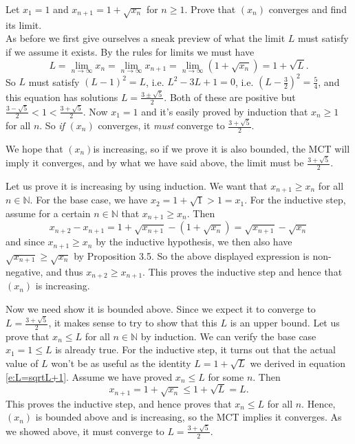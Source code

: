 \documentclass[11pt,dvipsnames]{book}
\numberwithin{figure}{section} %
\numberwithin{table}{section} %
\begin{document}
\begin{example}
\label{ex:1+sqrt(x)}
Let $x_{1}=1$ and $x_{n+1}=1+\sqrt{x_{n}}$ for $n \geq 1$. Prove that $(x_{n})$ converges and find its limit. \\

As before we first give ourselves a sneak preview of what the limit $L$ must satisfy if we assume it exists. By the rules for limits we must have
\begin{equation}
\label{e:L=sqrtL+1}
L=\lim_{n\rightarrow\infty}x_{n}
=\lim_{n\rightarrow\infty}x_{n+1}=\lim_{n\rightarrow\infty}(1+\sqrt{x_{n}})=1+\sqrt{L}.
\end{equation}
So $L$ must satisfy $(L-1)^2 = L$, i.e. $L^2 -3L +1=0$, i.e. $(L-\frac{3}{2})^2 = \frac{5}{4}$, and this equation has solutions $L = \frac{3 \pm \sqrt{5}}{2}$. Both of these are positive but $ \frac{3 -\sqrt{5}}{2} < 1 < \frac{3 + \sqrt{5}}{2}$. Now $x_1 = 1$ and it's easily proved by induction that $x_n \geq 1$ for all $n$. So {\em if} $(x_n)$ converges, it {\em must} converge to $\frac{3 + \sqrt{5}}{2}$.

We hope that $(x_n)$is increasing, so if we prove it is also bounded, the MCT will imply it converges, and by what we have said above, the limit must be $\frac{3 + \sqrt{5}}{2}$.

Let us prove it is increasing by using induction. We want that $x_{n+1}\geq x_{n}$ for all $n\in\mathbb{N}$. For the base case, we have $x_{2} = 1+\sqrt{1} > 1 = x_1$. For the inductive step, assume for a certain $n\in\mathbb{N}$ that $x_{n+1}\geq x_{n}$. Then
\[
x_{n+2}-x_{n+1}
=1+\sqrt{x_{n+1}}-(1+\sqrt{x_{n}})
=\sqrt{x_{n+1}}-\sqrt{x_{n}}
\]
and since $x_{n+1}\geq x_{n}$ by the inductive hypothesis, we then also have $\sqrt{x_{n+1}}\geq \sqrt{x_{n}}$ by Proposition 3.5. So the above displayed expression is non-negative, and thus $x_{n+2}\geq x_{n+1}$. This proves the inductive step and hence that $(x_n)$ is increasing.

Now we need show it is bounded above. Since we expect it to converge to $L = \frac{3 + \sqrt{5}}{2}$, it makes sense to try to show that this $L$ is an upper bound.
Let us prove that $x_{n}\leq L$ for all $n\in\mathbb{N}$ by induction.
We can verify the base case $x_{1}=1\leq L$ is already true. For the inductive step, it turns out that the actual value of $L$ won't be as useful as the identity $L=1+\sqrt{L}$ we derived in equation \eqref{e:L=sqrtL+1}. Assume we have proved $x_{n}\leq L$ for some $n$. Then
\[
x_{n+1}=1+\sqrt{x_{n}}\leq 1+\sqrt{L}=L.
\]
This proves the inductive step, and hence proves that $x_{n}\leq L$ for all $n$. Hence, $(x_n)$ is bounded above and is increasing, so the MCT implies it converges. As we showed above, it must converge to $L = \frac{3 + \sqrt{5}}{2}$.
\end{example}
\end{document}
